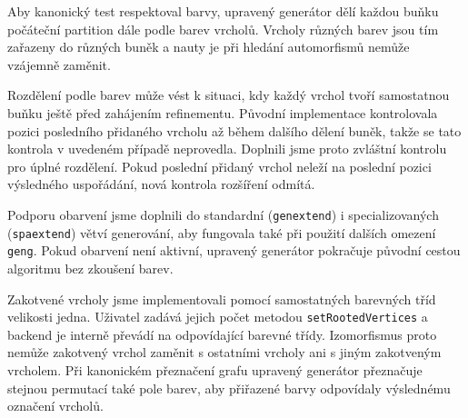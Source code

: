 Aby kanonický test respektoval barvy, upravený generátor dělí každou buňku
počáteční partition dále podle barev vrcholů. Vrcholy různých barev jsou tím
zařazeny do různých buněk a nauty je při hledání automorfismů nemůže vzájemně
zaměnit.

Rozdělení podle barev může vést k situaci, kdy každý vrchol tvoří samostatnou
buňku ještě před zahájením refinementu. Původní implementace kontrolovala
pozici posledního přidaného vrcholu až během dalšího dělení buněk, takže se
tato kontrola v uvedeném případě neprovedla. Doplnili jsme proto zvláštní
kontrolu pro úplné rozdělení. Pokud poslední přidaný vrchol neleží na poslední
pozici výsledného uspořádání, nová kontrola rozšíření odmítá.

Podporu obarvení jsme doplnili do standardní (\texttt{genextend}) i
specializovaných (\texttt{spaextend}) větví generování, aby fungovala také při
použití dalších omezení \texttt{geng}. Pokud obarvení není aktivní, upravený
generátor pokračuje původní cestou algoritmu bez zkoušení barev.

Zakotvené vrcholy jsme implementovali pomocí samostatných barevných tříd
velikosti jedna. Uživatel zadává jejich počet metodou
\texttt{setRootedVertices} a backend je interně převádí na odpovídající barevné
třídy. Izomorfismus proto nemůže zakotvený vrchol zaměnit s ostatními vrcholy
ani s jiným zakotveným vrcholem. Při kanonickém přeznačení grafu upravený
generátor přeznačuje stejnou permutací také pole barev, aby přiřazené barvy
odpovídaly výslednému označení vrcholů.
